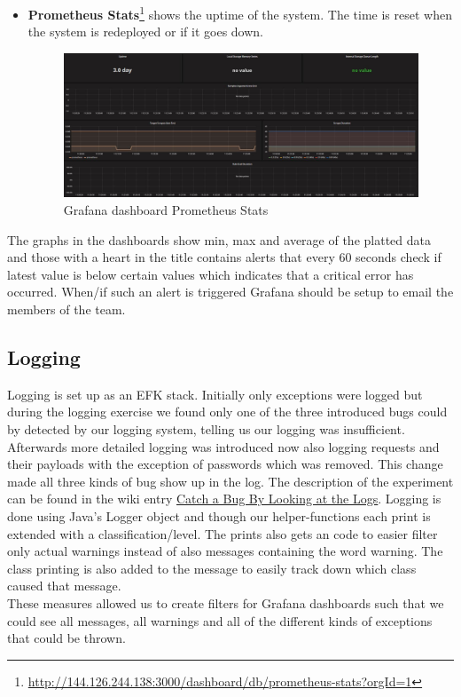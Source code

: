 \begin{itemize}
    \item \textbf{Prometheus Stats}\footnote{\url{http://144.126.244.138:3000/dashboard/db/prometheus-stats?orgId=1}} shows the uptime of the system. The time is reset when the system is redeployed or if it goes down.
    \begin{figure}[H]
        \centering
        \includegraphics[width=1.0\textwidth]{images/Grafana_prometheous_stats.JPG}
        \caption{Grafana dashboard Prometheus Stats}
        \label{fig:grafana_prometheus}
    \end{figure}
\end{itemize}
The graphs in the dashboards show min, max and average of the platted data and those with a heart in the title contains alerts that every 60 seconds check if latest value is below certain values which indicates that a critical error has occurred. When/if such an alert is triggered Grafana should be setup to email the members of the team.

\subsection{Logging}
\label{subsection:logging}
Logging is set up as an EFK stack. Initially only exceptions were logged but during the logging exercise we found only one of the three introduced bugs could by detected by our logging system, telling us our logging was insufficient. Afterwards more detailed logging was introduced now also logging requests and their payloads with the exception of passwords which was removed. This change made all three kinds of bug show up in the log. The description of the experiment can be found in the wiki entry \underline{\href{https://github.com/DevOps2021-gb/devops2021/wiki/Catch-a-Bug-By-Looking-at-the-Logs}{Catch a Bug By Looking at the Logs}}. Logging is done using Java's Logger object and though our helper-functions each print is extended with a classification/level. The prints also gets an code to easier filter only actual warnings instead of also messages containing the word warning. The class printing is also added to the message to easily track down which class caused that message.\\
These measures allowed us to create filters for Grafana dashboards such that we could see all messages, all warnings and all of the different kinds of exceptions that could be thrown. 


